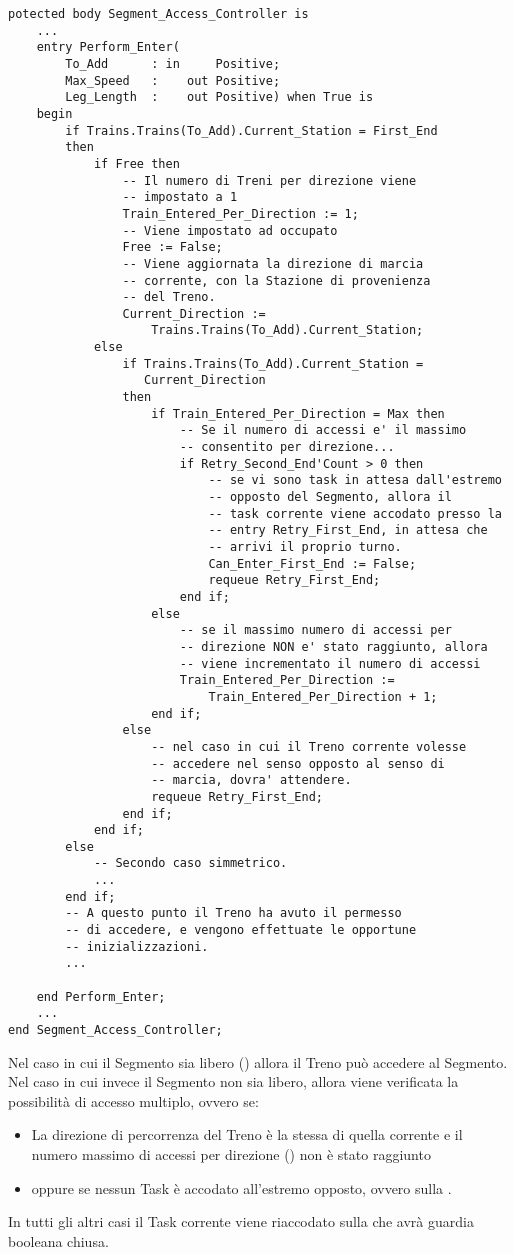 \begin{lstlisting}[caption=\small{Porzione della \ii{entry} \ttt{Perform\_Enter} per l'accesso dall'estremo \ttt{First\_End}},label=code:segment_monitor_perform_enter]
potected body Segment_Access_Controller is
	...
	entry Perform_Enter(
		To_Add      : in     Positive;
		Max_Speed   :    out Positive;
		Leg_Length  :    out Positive) when True is
	begin
		if Trains.Trains(To_Add).Current_Station = First_End 
		then
			if Free then
				-- Il numero di Treni per direzione viene 
				-- impostato a 1
				Train_Entered_Per_Direction := 1;
				-- Viene impostato ad occupato
				Free := False;
				-- Viene aggiornata la direzione di marcia
				-- corrente, con la Stazione di provenienza 
				-- del Treno.
				Current_Direction := 
					Trains.Trains(To_Add).Current_Station;
			else
				if Trains.Trains(To_Add).Current_Station = 
				   Current_Direction 
				then
					if Train_Entered_Per_Direction = Max then
						-- Se il numero di accessi e' il massimo 
						-- consentito per direzione...
						if Retry_Second_End'Count > 0 then
							-- se vi sono task in attesa dall'estremo
							-- opposto del Segmento, allora il
							-- task corrente viene accodato presso la 
							-- entry Retry_First_End, in attesa che 
							-- arrivi il proprio turno.
							Can_Enter_First_End := False;
							requeue Retry_First_End;
						end if;
					else
						-- se il massimo numero di accessi per 
						-- direzione NON e' stato raggiunto, allora
						-- viene incrementato il numero di accessi
						Train_Entered_Per_Direction := 
							Train_Entered_Per_Direction + 1;
					end if;
				else
					-- nel caso in cui il Treno corrente volesse 
					-- accedere nel senso opposto al senso di 
					-- marcia, dovra' attendere.
					requeue Retry_First_End;
				end if;
		 	end if;
		else
			-- Secondo caso simmetrico.
			...
		end if;	
		-- A questo punto il Treno ha avuto il permesso
		-- di accedere, e vengono effettuate le opportune
		-- inizializzazioni.
		...
			
	end Perform_Enter;
	...
end Segment_Access_Controller;
\end{lstlisting}

Nel caso in cui il Segmento sia libero () allora il Treno può accedere al Segmento.
Nel caso in cui invece il Segmento non sia libero, allora viene verificata la possibilità di accesso multiplo, ovvero se:
	\begin{itemize}
		\item La direzione di percorrenza del Treno è la stessa di quella corrente e il numero massimo di accessi per direzione () non è stato raggiunto 
		\item oppure se nessun Task è accodato all'estremo opposto, ovvero sulla  . 
	\end{itemize}
In tutti gli altri casi il Task corrente viene riaccodato sulla   che avrà guardia booleana chiusa.

